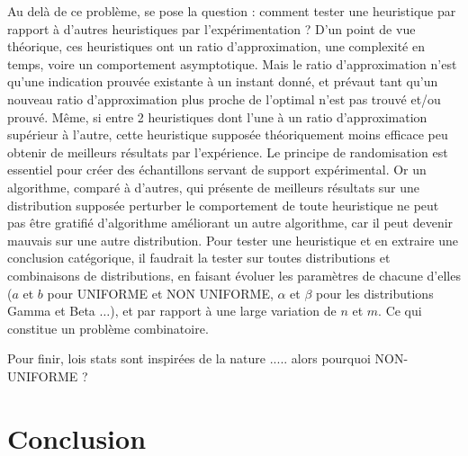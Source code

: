 \documentclass[a4paper,12pt]{report}
\theoremstyle{plain}				%
\theoremstyle{definition}				%
\begin{document}
Au delà de ce problème, se pose la question : comment tester une heuristique par rapport à d'autres heuristiques par l'expérimentation ?
D'un point de vue théorique, ces heuristiques ont un ratio d'approximation, 
  une complexité en temps, voire un comportement asymptotique. 
Mais le ratio d’approximation n’est qu'une indication prouvée existante 
  à un instant donné, et prévaut tant qu'un nouveau ratio d'approximation 
  plus proche de l'optimal n'est pas trouvé et/ou prouvé. 
Même, si entre 2 heuristiques dont l'une à un ratio d'approximation 
  supérieur à l'autre, cette heuristique supposée théoriquement moins 
  efficace peu obtenir de meilleurs résultats par l'expérience.      
Le principe de randomisation est essentiel pour créer des échantillons servant 
  de support expérimental. 
Or un algorithme, comparé à d'autres, qui présente de meilleurs résultats 
  sur une distribution supposée perturber le comportement de toute heuristique 
  ne peut pas être gratifié d'algorithme améliorant un autre algorithme, 
  car il peut devenir mauvais sur une autre distribution. 
Pour tester une heuristique et en extraire une conclusion catégorique, 
  il faudrait la tester sur toutes distributions et combinaisons 
  de distributions, en faisant évoluer les paramètres de chacune d'elles 
 ($a$ et $b$ pour UNIFORME et NON UNIFORME, $\alpha$ et $\beta$ 
  pour les distributions Gamma et Beta $\ldots$), 
  et par rapport à une large variation de $n$ et $m$.  
Ce qui constitue un problème combinatoire.

Pour finir, lois stats sont inspirées de la nature  ..... alors pourquoi NON-UNIFORME ?

\section{Conclusion} \label{sec:conclusion}
\end{document}
